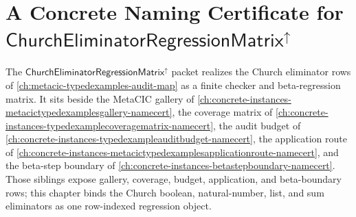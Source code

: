 \providecommand{\ChurchEliminatorRegressionMatrixUp}{\mathsf{ChurchEliminatorRegressionMatrix}^{\uparrow}}

\chapter{A Concrete Naming Certificate for $\ChurchEliminatorRegressionMatrixUp$}
\label{ch:concrete-instances-church-eliminator-regression-matrix-namecert}

The $\ChurchEliminatorRegressionMatrixUp$ packet realizes the Church eliminator rows of \autoref{ch:metacic-typedexamples-audit-map} as a finite checker and beta-regression matrix. It sits beside the MetaCIC gallery of \autoref{ch:concrete-instances-metacictypedexamplesgallery-namecert}, the coverage matrix of \autoref{ch:concrete-instances-typedexamplecoveragematrix-namecert}, the audit budget of \autoref{ch:concrete-instances-typedexampleauditbudget-namecert}, the application route of \autoref{ch:concrete-instances-metacictypedexamplesapplicationroute-namecert}, and the beta-step boundary of \autoref{ch:concrete-instances-betastepboundary-namecert}. Those siblings expose gallery, coverage, budget, application, and beta-boundary rows; this chapter binds the Church boolean, natural-number, list, and sum eliminators as one row-indexed regression object.

